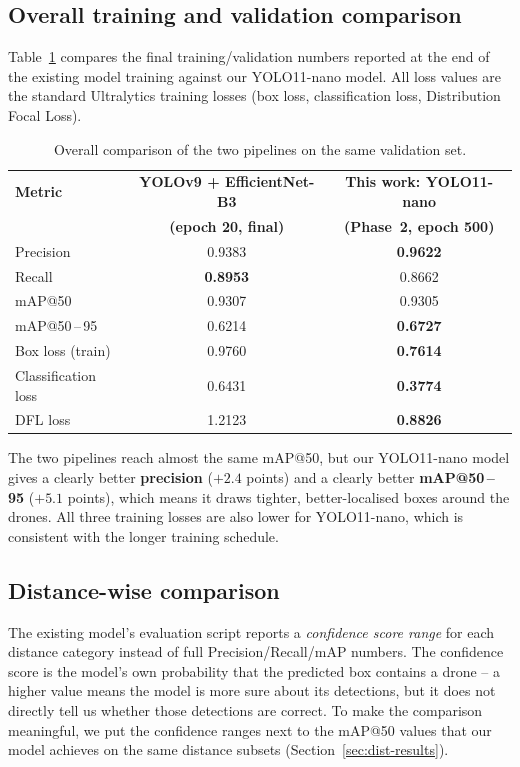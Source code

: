 \documentclass[12pt,a4paper]{report}
\begin{document}
\subsection{Overall training and validation comparison}
Table~\ref{tab:vs-prior-train} compares the final training/validation
numbers reported at the end of the existing model training against our YOLO11-nano model. All loss values are the standard Ultralytics training losses
(box loss, classification loss, Distribution Focal Loss).

\begin{table}[H]
\centering
\caption{Overall comparison of the two pipelines on the same validation set.}
\label{tab:vs-prior-train}
\small
\setlength{\tabcolsep}{4pt}
\begin{tabular}{lcc}
\toprule
\textbf{Metric} & \textbf{YOLOv9 + EfficientNet-B3} & \textbf{This work: YOLO11-nano} \\
                & \textbf{(epoch 20, final)}                & \textbf{(Phase~2, epoch 500)} \\
\midrule
Precision               & 0.9383 & \textbf{0.9622} \\
Recall                  & \textbf{0.8953} & 0.8662 \\
mAP@50                  & 0.9307 & 0.9305 \\
mAP@50\,--\,95          & 0.6214 & \textbf{0.6727} \\
\midrule
Box loss (train)        & 0.9760 & \textbf{0.7614} \\
Classification loss     & 0.6431 & \textbf{0.3774} \\
DFL loss                & 1.2123 & \textbf{0.8826} \\
\bottomrule
\end{tabular}
\end{table}

The two pipelines reach almost the same mAP@50, but our YOLO11-nano model
gives a clearly better \textbf{precision} ($+2.4$ points) and a clearly
better \textbf{mAP@50\,--\,95} ($+5.1$ points), which means it draws tighter,
better-localised boxes around the drones. All three training losses are
also lower for YOLO11-nano, which is consistent with the longer training schedule.

\subsection{Distance-wise comparison}
The existing model's evaluation script reports a \emph{confidence score range} for
each distance category instead of full Precision/Recall/mAP numbers. The
confidence score is the model's own probability that the predicted box
contains a drone -- a higher value means the model is more sure about its
detections, but it does not directly tell us whether those detections are
correct. To make the comparison meaningful, we put the confidence
ranges next to the mAP@50 values that our model achieves on the same
distance subsets (Section~\ref{sec:dist-results}).
\end{document}

